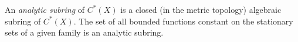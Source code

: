 An \emph{analytic subring} of $C^*(X)$ is a closed (in the metric topology) algebraic subring of $C^*(X)$. The set of all bounded functions constant on the stationary sets of a given family is an analytic subring.
